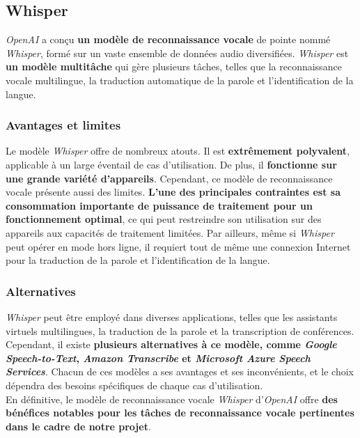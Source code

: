 \subsection{Whisper}
\label{subsec:Whisper}


\textit{OpenAI} a conçu \textbf{un modèle de reconnaissance vocale} de pointe nommé \textit{Whisper}, formé sur un vaste ensemble de données audio diversifiées.
\textit{Whisper} est \textbf{un modèle multitâche} qui gère plusieurs tâches, telles que la reconnaissance vocale multilingue,
la traduction automatique de la parole et l'identification de la langue.

\subsubsection*{Avantages et limites}
Le modèle \textit{Whisper} offre de nombreux atouts. Il est \textbf{extrêmement polyvalent}, applicable à un large éventail de cas d'utilisation.
De plus, il \textbf{fonctionne sur une grande variété d'appareils}. Cependant, ce modèle de reconnaissance vocale présente aussi des limites.
\textbf{L'une des principales contraintes est sa consommation importante de puissance de traitement pour un fonctionnement optimal},
ce qui peut restreindre son utilisation sur des appareils aux capacités de traitement limitées.
Par ailleurs, même si \textit{Whisper} peut opérer en mode hors ligne, il requiert tout de même une connexion Internet pour la traduction
de la parole et l'identification de la langue.

\subsubsection*{Alternatives}

\textit{Whisper} peut être employé dans diverses applications, telles que les assistants virtuels multilingues,
la traduction de la parole et la transcription de conférences. Cependant, il existe
\textbf{plusieurs alternatives à ce modèle, comme \textit{Google Speech-to-Text}, \textit{Amazon Transcribe} et \textit{Microsoft Azure Speech Services}}.
Chacun de ces modèles a ses avantages et ses inconvénients, et le choix dépendra des besoins spécifiques de chaque cas d'utilisation.\\

En définitive, le modèle de reconnaissance vocale \textit{Whisper} d'\textit{OpenAI} offre \textbf{des bénéfices notables pour les tâches de reconnaissance
    vocale pertinentes dans le cadre de notre projet}.
